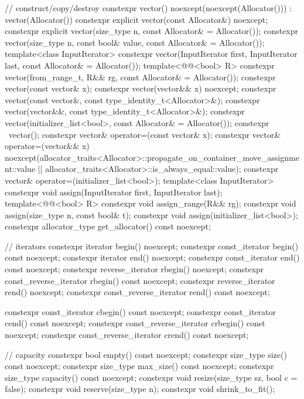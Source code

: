 \begin{codeblock}
{{    // construct/copy/destroy
    constexpr vector() noexcept(noexcept(Allocator())) : vector(Allocator()) { }
    constexpr explicit vector(const Allocator&) noexcept;
    constexpr explicit vector(size_type n, const Allocator& = Allocator());
    constexpr vector(size_type n, const bool& value, const Allocator& = Allocator());
    template<class InputIterator>
      constexpr vector(InputIterator first, InputIterator last, const Allocator& = Allocator());
    template<@@<bool> R>
      constexpr vector(from_range_t, R&& rg, const Allocator& = Allocator());
    constexpr vector(const vector& x);
    constexpr vector(vector&& x) noexcept;
    constexpr vector(const vector&, const type_identity_t<Allocator>&);
    constexpr vector(vector&&, const type_identity_t<Allocator>&);
    constexpr vector(initializer_list<bool>, const Allocator& = Allocator());
    constexpr ~vector();
    constexpr vector& operator=(const vector& x);
    constexpr vector& operator=(vector&& x)
      noexcept(allocator_traits<Allocator>::propagate_on_container_move_assignment::value ||
               allocator_traits<Allocator>::is_always_equal::value);
    constexpr vector& operator=(initializer_list<bool>);
    template<class InputIterator>
      constexpr void assign(InputIterator first, InputIterator last);
    template<@@<bool> R>
      constexpr void assign_range(R&& rg);
    constexpr void assign(size_type n, const bool& t);
    constexpr void assign(initializer_list<bool>);
    constexpr allocator_type get_allocator() const noexcept;

    // iterators
    constexpr iterator               begin() noexcept;
    constexpr const_iterator         begin() const noexcept;
    constexpr iterator               end() noexcept;
    constexpr const_iterator         end() const noexcept;
    constexpr reverse_iterator       rbegin() noexcept;
    constexpr const_reverse_iterator rbegin() const noexcept;
    constexpr reverse_iterator       rend() noexcept;
    constexpr const_reverse_iterator rend() const noexcept;

    constexpr const_iterator         cbegin() const noexcept;
    constexpr const_iterator         cend() const noexcept;
    constexpr const_reverse_iterator crbegin() const noexcept;
    constexpr const_reverse_iterator crend() const noexcept;

    // capacity
    constexpr bool empty() const noexcept;
    constexpr size_type size() const noexcept;
    constexpr size_type max_size() const noexcept;
    constexpr size_type capacity() const noexcept;
    constexpr void      resize(size_type sz, bool c = false);
    constexpr void      reserve(size_type n);
    constexpr void      shrink_to_fit();

}}
\end{codeblock}
